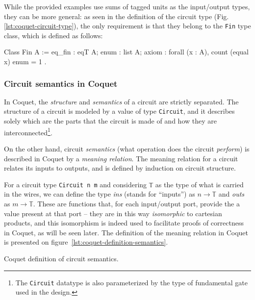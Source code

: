             While the provided examples use sums of tagged units as the input/output types, they can
            be more general: as seen in the definition of the circuit type (Fig.
            \ref{lst:coquet-circuit-type}), the only requirement is that they belong to the
            \texttt{Fin} type class, which is defined as follows:

            \begin{coqcode}
        Class Fin A := {
            eq_fin : eqT A;
            enum   : list A;
            axiom  : forall (x : A), count (equal x) enum = 1
        }.
            \end{coqcode}


        \subsubsection{Circuit semantics in Coquet}
        \label{subsubsec:coquet-semantics}
            In Coquet, the \emph{structure} and \emph{semantics} of a circuit are strictly
            separated. The structure of a circuit is modeled by a value of type \texttt{Circuit},
            and it describes solely which are the parts that the circuit is made of and how they are
            interconnected\footnote{The \texttt{Circuit} datatype is also parameterized by the type
                of fundamental gate used in the design.}.

            On the other hand, circuit \emph{semantics} (what operation does the circuit
            \emph{perform}) is described in Coquet by a \emph{meaning relation}. The meaning
            relation for a circuit relates its inputs to outputs, and is defined by induction on
            circuit structure.

            For a circuit type \texttt{Circuit n m} and considering \texttt{𝕋} as the type of
            what is carried in the wires, we can define the type \emph{ins} (stands for
            ``inputs'') as $n \rightarrow 𝕋$ and \emph{outs} as $m \rightarrow 𝕋$. These are
            functions that, for each input/output port, provide the a value present at that port
            -- they are in this way \emph{isomorphic} to cartesian products, and this isomorphism
            is indeed used to facilitate proofs of correctness in Coquet, as will be seen later.
            The definition of the meaning relation in Coquet is presented on
            figure~\ref{lst:coquet-definition-semantics}.

            \begin{listing}[h!]
                \caption{Coquet definition of circuit semantics.
                    \label{lst:coquet-definition-semantics}}
            \end{listing}

